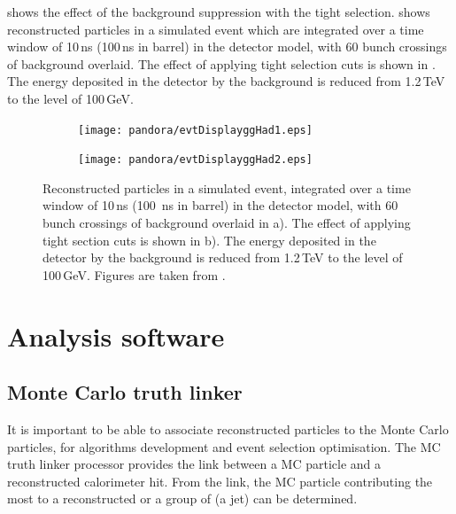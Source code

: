  shows the effect of the background suppression   with the tight \PFO selection.   shows reconstructed particles  in a simulated \HepProcess{\Pep\Pem \to \PHiggs\PHiggs \to \Ptop\APbottom\Pbottom\APtop} event which are integrated over a time window of 10\,ns (100\,ns in \HCAL barrel) in the \CLICILD detector model, with 60 bunch crossings of \ggHad background overlaid. The effect of applying tight \PFO selection cuts is shown in . The energy deposited in the detector by the background is reduced from 1.2\,TeV to the level of 100\,GeV.


\begin{figure}[tbph]
\centering
  \begin{subfigure}[b]{0.45\textwidth}
    \texttt{[image: pandora/evtDisplayggHad1.eps]}
    \caption{}
    \label{fig:pandoraEvtDisplayggHad1}
  \end{subfigure}
  \begin{subfigure}[b]{0.45\textwidth}
    \texttt{[image: pandora/evtDisplayggHad2.eps]}
    \caption{}
    \label{fig:pandoraEvtDisplayggHad2}
  \end{subfigure}
\caption[Effect of the suppression of the background with the tight \PFO selection.]
{Reconstructed particles  in a simulated \HepProcess{\Pep\Pem \to \PHiggs\PHiggs \to \Ptop\APbottom\Pbottom\APtop} event, integrated over a time window of 10\,ns (100 \,ns in \HCAL barrel) in the \CLICILD detector model, with 60 bunch crossings of \ggHad background overlaid in a). The effect of applying tight \PFO section cuts is shown in b). The energy deposited in the detector by the background is reduced from 1.2\,TeV to the level of 100\,GeV. Figures are taken from \cite{Marshall:2012ry}.}
\label{fig:pandoraEvtDisplayggHad}
\end{figure}



\section{Analysis software}


\subsection{Monte Carlo truth linker}
\label{sec:pandoraMCtruthLink}
It is important to be able to associate reconstructed particles to the Monte Carlo particles, for algorithms development and  event selection optimisation. The MC truth linker processor provides the link between a MC particle and a  reconstructed calorimeter hit. From the link, the MC particle contributing the most to a reconstructed \PFO or a group of \PFOs (a jet) can be determined.

